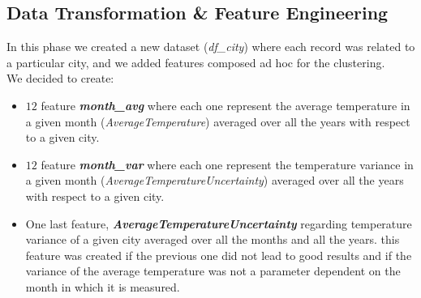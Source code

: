 \subsection{Data Transformation \& Feature Engineering}
In this phase we created a new dataset (\textit{df\_city}) where each record was related to a particular city, and we added features composed ad hoc for the clustering.\\
We decided to create:
\begin{itemize}
    \item $12$ feature \textit{\textbf{month\_avg}} where each one represent the average temperature in a given month (\textit{AverageTemperature}) averaged over all the years with respect to a given city.
    \item $12$ feature \textit{\textbf{month\_var}} where each one represent the temperature variance in a given month (\textit{AverageTemperatureUncertainty}) averaged over all the years  with respect to a given city.
    \item One last feature, \textit{\textbf{AverageTemperatureUncertainty}} regarding temperature variance of a given city averaged over all the months and all the years. this feature was created if the previous one did not lead to good results and if the variance of the average temperature was not a parameter dependent on the month in which it is measured.
\end{itemize} 

